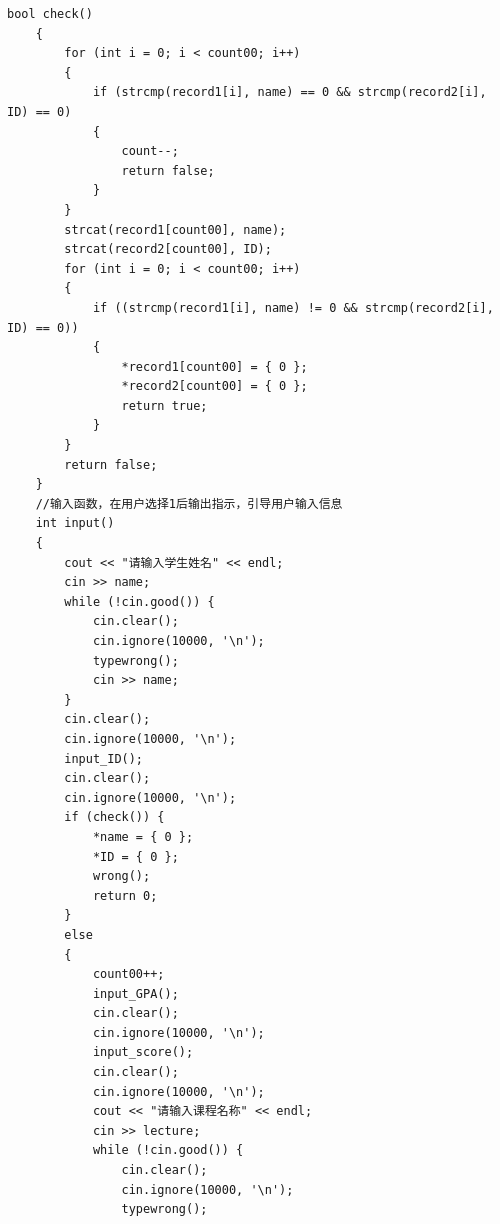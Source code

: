 \documentclass[fontset=windows]{article}
\begin{document}
\begin{lstlisting}[style = {cppstyle}]
	bool check()
	{
		for (int i = 0; i < count00; i++)
		{
			if (strcmp(record1[i], name) == 0 && strcmp(record2[i], ID) == 0)
			{
				count--;
				return false;
			}
		}
		strcat(record1[count00], name);
		strcat(record2[count00], ID);
		for (int i = 0; i < count00; i++)
		{
			if ((strcmp(record1[i], name) != 0 && strcmp(record2[i], ID) == 0))
			{
				*record1[count00] = { 0 };
				*record2[count00] = { 0 };
				return true;
			}
		}
		return false;
	}
	//输入函数，在用户选择1后输出指示，引导用户输入信息     
	int input()
	{
		cout << "请输入学生姓名" << endl;
		cin >> name;
		while (!cin.good()) {
			cin.clear();
			cin.ignore(10000, '\n');
			typewrong();
			cin >> name;
		}
		cin.clear();
		cin.ignore(10000, '\n');
		input_ID();
		cin.clear();
		cin.ignore(10000, '\n');
		if (check()) {
			*name = { 0 };
			*ID = { 0 };
			wrong();
			return 0;
		}
		else
		{
			count00++;
			input_GPA();
			cin.clear();
			cin.ignore(10000, '\n');
			input_score();
			cin.clear();
			cin.ignore(10000, '\n');
			cout << "请输入课程名称" << endl;
			cin >> lecture;
			while (!cin.good()) {
				cin.clear();
				cin.ignore(10000, '\n');
				typewrong();


\end{lstlisting}
\end{document}
